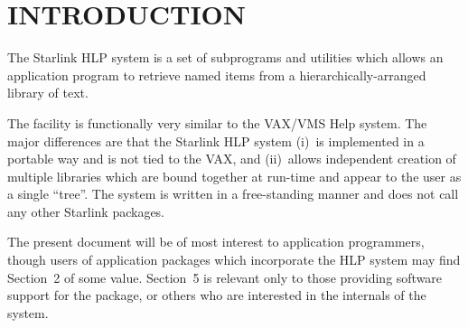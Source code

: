\documentclass[11pt,nolof]{starlink}
\begin{document}
\scfrontmatter

\section{INTRODUCTION}
The Starlink HLP system is a set of subprograms and utilities which
allows an application program to retrieve named items from
a hierarchically-arranged library of text.

The facility is functionally
very similar to the VAX/VMS Help system.  The major differences
are that the Starlink HLP system (i)~is implemented in
a portable way and is not tied to the VAX, and (ii)~allows
independent creation of multiple libraries which
are bound together at run-time and appear to the user as a single
``tree''.  The system is written in a free-standing manner and does not call
any other Starlink packages.

The present document will be of most interest to application programmers,
though users of application packages which incorporate the HLP system
may find Section~2 of some
value.  Section~5 is
relevant only to those providing software support for the package,
or others who are interested in the internals of the system.
\end{document}
